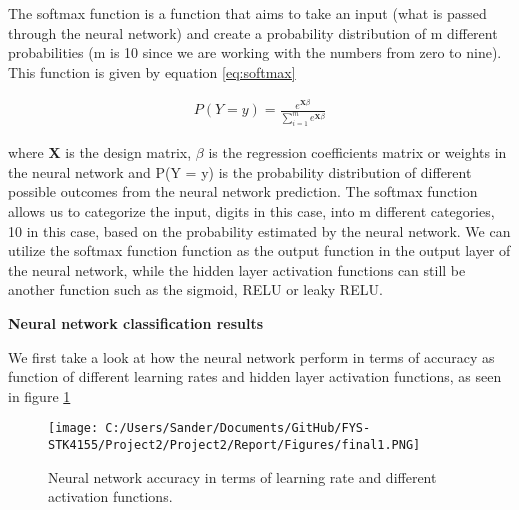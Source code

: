 \documentclass[12pt,a4paper]{article}
\begin{document}
\noindent The softmax function is a function that aims to take an input (what is passed through the neural network) and create a probability distribution of m different probabilities (m is 10 since we are working with the numbers from zero to nine). This function is given by equation \ref{eq:softmax}

\begin{equation}\label{eq:softmax}
\begin{aligned}
P(Y = y) = \frac{e^{\textbf{X}\beta}}{\sum_{i = 1}^m e^{\textbf{X}\beta}} 
\end{aligned}
\end{equation}

\noindent where \textbf{X} is the design matrix, $\beta$ is the regression coefficients matrix or weights in the neural network and P(Y = y) is the probability distribution of different possible outcomes from the neural network prediction. The softmax function allows us to categorize the input, digits in this case, into m different categories, 10 in this case, based on the probability estimated by the neural network. We can utilize the softmax function function as the output function in the output layer of the neural network, while the hidden layer activation functions can still be another function such as the sigmoid, RELU or leaky RELU. 

\begin{center}
\large{\textbf{Neural network classification results}}
\end{center}

\noindent We first take a look at how the neural network perform in terms of accuracy as function of different learning rates and hidden layer activation functions, as seen in figure \ref{fig:AccvsLrate}

\begin{figure}[H]
\centering
\texttt{[image: C:/Users/Sander/Documents/GitHub/FYS-STK4155/Project2/Project2/Report/Figures/final1.PNG]}
\caption{\label{fig:AccvsLrate} Neural network accuracy in terms of learning rate and different activation functions.}
\end{figure}
\end{document}
